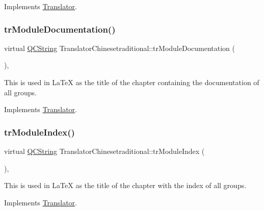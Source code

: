 Implements \mbox{\hyperlink{class_translator}{Translator}}.

\mbox{\label{class_translator_chinesetraditional_a2fa6ec38cec31f9282b3d697ff02e135}} 
\subsubsection{\texorpdfstring{trModuleDocumentation()}{trModuleDocumentation()}}
{\footnotesize\ttfamily virtual \mbox{\hyperlink{class_q_c_string}{Q\+C\+String}} Translator\+Chinesetraditional\+::tr\+Module\+Documentation (\begin{DoxyParamCaption}{ }\end{DoxyParamCaption})\hspace{0.3cm}{\ttfamily [inline]}, {\ttfamily [virtual]}}

This is used in La\+TeX as the title of the chapter containing the documentation of all groups. 

Implements \mbox{\hyperlink{class_translator}{Translator}}.

\mbox{\label{class_translator_chinesetraditional_aeda555d82882d5ba994b3ab492ec8903}} 
\subsubsection{\texorpdfstring{trModuleIndex()}{trModuleIndex()}}
{\footnotesize\ttfamily virtual \mbox{\hyperlink{class_q_c_string}{Q\+C\+String}} Translator\+Chinesetraditional\+::tr\+Module\+Index (\begin{DoxyParamCaption}{ }\end{DoxyParamCaption})\hspace{0.3cm}{\ttfamily [inline]}, {\ttfamily [virtual]}}

This is used in La\+TeX as the title of the chapter with the index of all groups. 

Implements \mbox{\hyperlink{class_translator}{Translator}}.

